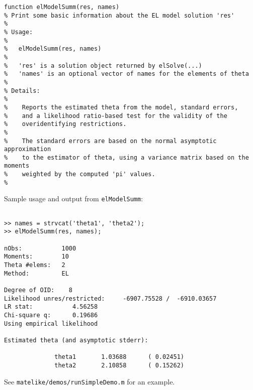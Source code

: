 \begin{lstlisting}[commentstyle=\ttfamily]
function elModelSumm(res, names)
% Print some basic information about the EL model solution 'res'
%
% Usage:
%
%   elModelSumm(res, names)
%
%   'res' is a solution object returned by elSolve(...)
%   'names' is an optional vector of names for the elements of theta
%
% Details:
%
%    Reports the estimated theta from the model, standard errors,
%    and a likelihood ratio-based test for the validity of the
%    overidentifying restrictions.
%
%    The standard errors are based on the normal asymptotic approximation
%    to the estimator of theta, using a variance matrix based on the moments
%    weighted by the computed 'pi' values.
%
\end{lstlisting}

Sample usage and output from \texttt{elModelSumm}:

\begin{verbatim}

>> names = strvcat('theta1', 'theta2');
>> elModelSumm(res, names);

nObs:           1000
Moments:        10
Theta #elems:   2
Method:         EL

Degree of OID:    8
Likelihood unres/restricted:     -6907.75528 /  -6910.03657
LR stat:           4.56258
Chi-square q:      0.19686
Using empirical likelihood

Estimated theta (and asymptotic stderr):

              theta1       1.03688      ( 0.02451)
              theta2       2.10858      ( 0.15262)

\end{verbatim}


See \texttt{matelike/demos/runSimpleDemo.m} for an example.

